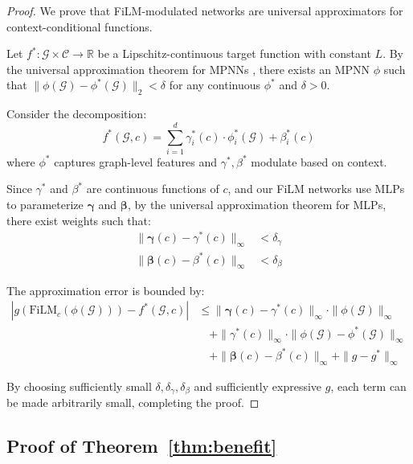 \documentclass{article}
\begin{document}
\begin{proof}
We prove that FiLM-modulated networks are universal approximators for context-conditional functions.

Let $f^*: \mathcal{G} \times \mathcal{C} \rightarrow \mathbb{R}$ be a Lipschitz-continuous target function with constant $L$. By the universal approximation theorem for MPNNs \citep{xu_2019_gnn_power}, there exists an MPNN $\phi$ such that $\|\phi(\mathcal{G}) - \phi^*(\mathcal{G})\|_2 < \delta$ for any continuous $\phi^*$ and $\delta > 0$.

Consider the decomposition:
\begin{equation}
    f^*(\mathcal{G}, c) = \sum_{i=1}^{d} \gamma_i^*(c) \cdot \phi_i^*(\mathcal{G}) + \beta_i^*(c)
\end{equation}
where $\phi^*$ captures graph-level features and $\gamma^*, \beta^*$ modulate based on context.

Since $\gamma^*$ and $\beta^*$ are continuous functions of $c$, and our FiLM networks use MLPs to parameterize $\boldsymbol{\gamma}$ and $\boldsymbol{\beta}$, by the universal approximation theorem for MLPs, there exist weights such that:
\begin{align}
    \|\boldsymbol{\gamma}(c) - \gamma^*(c)\|_\infty &< \delta_\gamma \\
    \|\boldsymbol{\beta}(c) - \beta^*(c)\|_\infty &< \delta_\beta
\end{align}

The approximation error is bounded by:
\begin{align}
    |g(\text{FiLM}_c(\phi(\mathcal{G}))) - f^*(\mathcal{G}, c)| &\leq \|\boldsymbol{\gamma}(c) - \gamma^*(c)\|_\infty \cdot \|\phi(\mathcal{G})\|_\infty \\
    &\quad + \|\gamma^*(c)\|_\infty \cdot \|\phi(\mathcal{G}) - \phi^*(\mathcal{G})\|_\infty \\
    &\quad + \|\boldsymbol{\beta}(c) - \beta^*(c)\|_\infty + \|g - g^*\|_\infty
\end{align}

By choosing sufficiently small $\delta, \delta_\gamma, \delta_\beta$ and sufficiently expressive $g$, each term can be made arbitrarily small, completing the proof.
\end{proof}

\subsection{Proof of Theorem~\ref{thm:benefit}}
\end{document}
